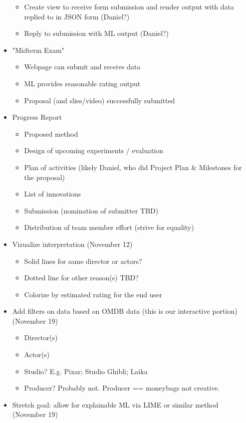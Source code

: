 \begin{itemize}
\begin{itemize}
      \item Create view to receive form submission and render output with data replied to in JSON form (Daniel?)
      \item Reply to submission with ML output (Daniel?)
    \end {itemize}
  \item "Midterm Exam"
    \begin{itemize}
      \item Webpage can submit and receive data
      \item ML provides reasonable rating output
      \item Proposal (and slies/video) successfully submitted
    \end{itemize}
  \item Progress Report
    \begin{itemize}
      \item Proposed method
      \item Design of upcoming experiments / evaluation
      \item Plan of activities (likely Daniel, who did Project Plan & Milestones for the proposal)
      \item List of innovations
      \item Submission (nomination of submitter TBD)
      \item Distribution of team member effort (strive for equality)
    \end{itemize}
  \item Vizualize interpretation (November 12)
    \begin{itemize}
      \item Solid lines for same director or actors?
      \item Dotted line for other reason(s) TBD?
      \item Colorize by estimated rating for the end user
    \end{itemize}
  \item Add filters on data based on OMDB data (this is our interactive portion) (November 19)
    \begin{itemize}
      \item Director(s)
      \item Actor(s)
      \item Studio? E.g. Pixar; Studio Ghibli; Laika
      \item Producer? Probably not. Producer == moneybags not creative.
    \end{itemize}
  \item Stretch goal: allow for explainable ML via LIME or similar method (November 19)

\end{itemize}
